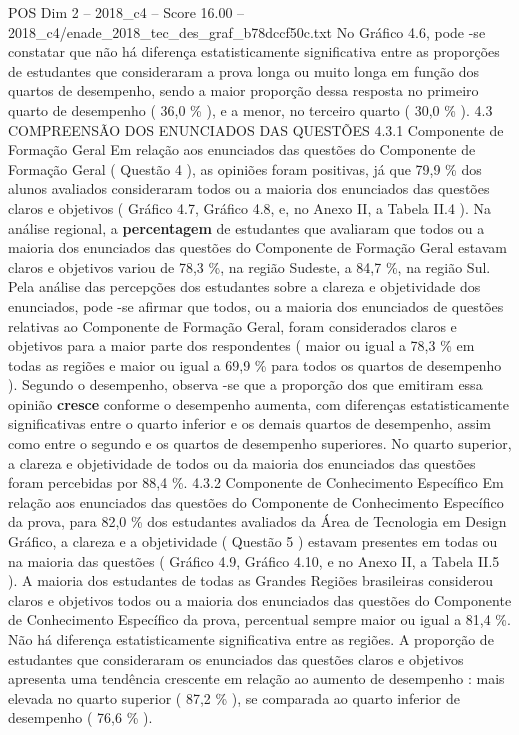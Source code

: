 \begin{textsample}{POS Dim 2 – 2018\_c4 – Score 16.00 – 2018\_c4/enade\_2018\_tec\_des\_graf\_b78dccf50c.txt}
No Gráfico 4.6, pode -se constatar que não há diferença estatisticamente significativa entre as proporções de estudantes que consideraram a prova longa ou muito longa em função dos quartos de desempenho, sendo a maior proporção dessa resposta no primeiro quarto de desempenho ( 36,0 \% ), e a menor, no terceiro quarto ( 30,0 \% ). 4.3 COMPREENSÃO DOS ENUNCIADOS DAS QUESTÕES 4.3.1 Componente de Formação Geral Em relação aos enunciados das questões do Componente de Formação Geral ( Questão 4 ), as opiniões foram positivas, já que 79,9 \% dos alunos avaliados consideraram todos ou a maioria dos enunciados das questões claros e objetivos ( Gráfico 4.7, Gráfico 4.8, e, no Anexo II, a Tabela II.4 ).
Na análise regional, a \textbf{percentagem} de estudantes que avaliaram que todos ou a maioria dos enunciados das questões do Componente de Formação Geral estavam claros e objetivos variou de 78,3 \%, na região Sudeste, a 84,7 \%, na região Sul.
Pela análise das percepções dos estudantes sobre a clareza e objetividade dos enunciados, pode -se afirmar que todos, ou a maioria dos enunciados de questões relativas ao Componente de Formação Geral, foram considerados claros e objetivos para a maior parte dos respondentes ( maior ou igual a 78,3 \% em todas as regiões e maior ou igual a 69,9 \% para todos os quartos de desempenho ).
Segundo o desempenho, observa -se que a proporção dos que emitiram essa opinião \textbf{cresce} conforme o desempenho aumenta, com diferenças estatisticamente significativas entre o quarto inferior e os demais quartos de desempenho, assim como entre o segundo e os quartos de desempenho superiores.
No quarto superior, a clareza e objetividade de todos ou da maioria dos enunciados das questões foram percebidas por 88,4 \%. 4.3.2 Componente de Conhecimento Específico Em relação aos enunciados das questões do Componente de Conhecimento Específico da prova, para 82,0 \% dos estudantes avaliados da Área de Tecnologia em Design Gráfico, a clareza e a objetividade ( Questão 5 ) estavam presentes em todas ou na maioria das questões ( Gráfico 4.9, Gráfico 4.10, e no Anexo II, a Tabela II.5 ).
A maioria dos estudantes de todas as Grandes Regiões brasileiras considerou claros e objetivos todos ou a maioria dos enunciados das questões do Componente de Conhecimento Específico da prova, percentual sempre maior ou igual a 81,4 \%.
Não há diferença estatisticamente significativa entre as regiões.
A proporção de estudantes que consideraram os enunciados das questões claros e objetivos apresenta uma tendência crescente em relação ao aumento de desempenho : mais elevada no quarto superior ( 87,2 \% ), se comparada ao quarto inferior de desempenho ( 76,6 \% ).

\end{textsample}
